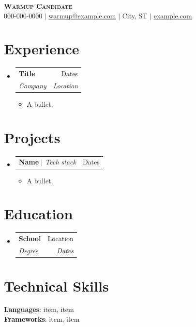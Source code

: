 \documentclass[letterpaper,11pt]{article}
\makeatletter
\newcommand{\resumeItem}[1]{\item\small{{#1 \vspace{-2pt}}}}
\newcommand{\resumeSubheading}[4]{\vspace{-2pt}\item\begin{tabular*}{0.97\textwidth}[t]{l@{\extracolsep{\fill}}r}\textbf{#1} & #2 \\ \textit{\small#3} & \textit{\small #4} \\\end{tabular*}\vspace{-7pt}}
\newcommand{\resumeProjectHeading}[2]{\item\begin{tabular*}{0.97\textwidth}{l@{\extracolsep{\fill}}r}\small#1 & #2 \\\end{tabular*}\vspace{-7pt}}
\newcommand{\resumeSubHeadingListStart}{\begin{itemize}[leftmargin=0.15in, label={}]}
\newcommand{\resumeSubHeadingListEnd}{\end{itemize}}
\newcommand{\resumeItemListStart}{\begin{itemize}}
\newcommand{\resumeItemListEnd}{\end{itemize}\vspace{-5pt}}
\makeatother
\begin{document}
\begin{center}
    \textbf{\Huge \scshape Warmup Candidate} \\ \vspace{1pt}
    \small 000-000-0000 $|$ \href{mailto:warmup@example.com}{\underline{warmup@example.com}} $|$ City, ST $|$ \href{https://example.com}{\underline{example.com}}
\end{center}
\section{Experience}
  \resumeSubHeadingListStart
    \resumeSubheading{Title}{Dates}{Company}{Location}
    \resumeItemListStart
      \resumeItem{A bullet.}
    \resumeItemListEnd
  \resumeSubHeadingListEnd
\section{Projects}
    \resumeSubHeadingListStart
      \resumeProjectHeading{\textbf{Name} $|$ \emph{Tech stack}}{Dates}
      \resumeItemListStart
        \resumeItem{A bullet.}
      \resumeItemListEnd
    \resumeSubHeadingListEnd
\section{Education}
  \resumeSubHeadingListStart
    \resumeSubheading{School}{Location}{Degree}{Dates}
  \resumeSubHeadingListEnd
\section{Technical Skills}
 \begin{itemize}[leftmargin=0.15in, label={}]
    \small{\item{
     \textbf{Languages}{: item, item} \\
     \textbf{Frameworks}{: item, item}
    }}
 \end{itemize}
\end{document}
